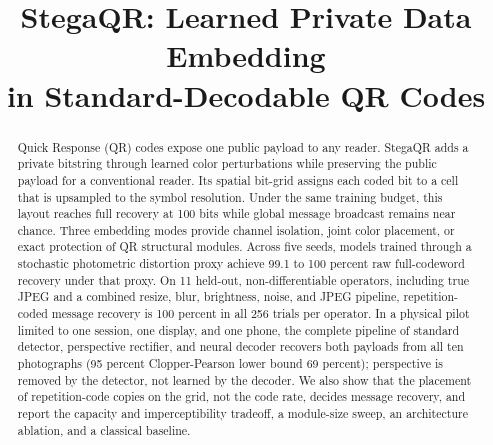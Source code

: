 \documentclass[conference]{IEEEtran}
\begin{document}
\title{StegaQR: Learned Private Data Embedding\\ in Standard-Decodable QR Codes}

\author{
\and
{}
\and
{}
}

\maketitle

\begin{abstract}
Quick Response (QR) codes expose one public payload to any reader. StegaQR adds a
private bitstring through learned color perturbations while preserving the public
payload for a conventional reader. Its spatial bit-grid assigns each coded bit to a
cell that is upsampled to the symbol resolution. Under the same training budget, this
layout reaches full recovery at 100 bits while global message broadcast remains near
chance. Three embedding modes provide channel isolation, joint color placement, or
exact protection of QR structural modules. Across five seeds, models trained through
a stochastic photometric distortion proxy achieve 99.1 to 100 percent raw full-codeword
recovery under that proxy. On 11 held-out, non-differentiable operators, including true
JPEG and a combined resize, blur, brightness, noise, and JPEG pipeline, repetition-coded
message recovery is 100 percent in all 256 trials per operator. In a physical pilot
limited to one session, one display, and one phone, the complete pipeline of standard
detector, perspective rectifier, and neural decoder recovers both payloads from all ten
photographs (95 percent Clopper-Pearson lower bound 69 percent); perspective is removed
by the detector, not learned by the decoder. We also show that the placement of
repetition-code copies on the grid, not the code rate, decides message recovery, and
report the capacity and imperceptibility tradeoff, a module-size sweep, an architecture
ablation, and a classical baseline.
\end{abstract}
\end{document}
